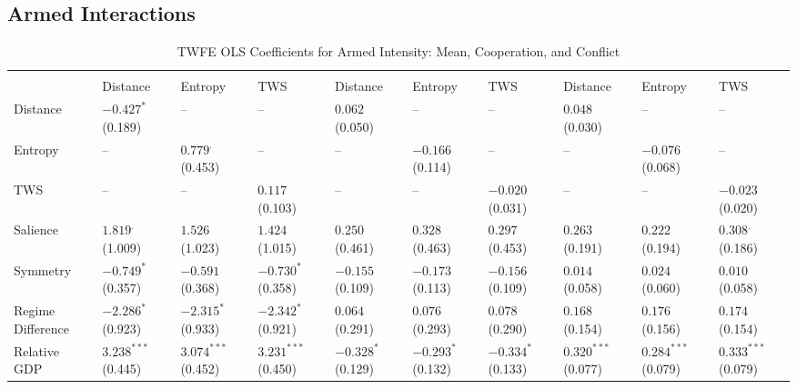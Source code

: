 \documentclass[12pt]{article}
\begin{document}
\subsection{Armed Interactions}
\begin{table}[htbp]\scriptsize
\centering
\caption{TWFE OLS Coefficients for Armed Intensity: Mean, Cooperation, and Conflict}
\renewcommand{\arraystretch}{1.2}
\begin{tabularx}{\textwidth}{
  l
  >{\centering\arraybackslash}X >{\centering\arraybackslash}X >{\centering\arraybackslash}X
  >{\centering\arraybackslash}X >{\centering\arraybackslash}X >{\centering\arraybackslash}X
  >{\centering\arraybackslash}X >{\centering\arraybackslash}X >{\centering\arraybackslash}X
}
\toprule
\rowcolor{gray!20}
 & \multicolumn{3}{c}{\textbf{Mean}} 
 & \multicolumn{3}{c}{\textbf{Cooperation}} 
 & \multicolumn{3}{c}{\textbf{Conflict}} \\
\cmidrule(lr){2-4} \cmidrule(lr){5-7} \cmidrule(lr){8-10}
 & Distance & Entropy & TWS & Distance & Entropy & TWS & Distance & Entropy & TWS \\
\midrule
Distance & $-0.427^{*}$ (0.189) & -- & -- & $0.062^{}$ (0.050) & -- & -- & $0.048^{}$ (0.030) & -- & -- \\
Entropy & -- & $0.779^{.}$ (0.453) & -- & -- & $-0.166^{}$ (0.114) & -- & -- & $-0.076^{}$ (0.068) & -- \\
TWS & -- & -- & $0.117^{}$ (0.103) & -- & -- & $-0.020^{}$ (0.031) & -- & -- & $-0.023^{}$ (0.020) \\
Salience & $1.819^{.}$ (1.009) & $1.526^{}$ (1.023) & $1.424^{}$ (1.015) & $0.250^{}$ (0.461) & $0.328^{}$ (0.463) & $0.297^{}$ (0.453) & $0.263^{}$ (0.191) & $0.222^{}$ (0.194) & $0.308^{.}$ (0.186) \\
Symmetry & $-0.749^{*}$ (0.357) & $-0.591^{}$ (0.368) & $-0.730^{*}$ (0.358) & $-0.155^{}$ (0.109) & $-0.173^{}$ (0.113) & $-0.156^{}$ (0.109) & $0.014^{}$ (0.058) & $0.024^{}$ (0.060) & $0.010^{}$ (0.058) \\
Regime Difference & $-2.286^{*}$ (0.923) & $-2.315^{*}$ (0.933) & $-2.342^{*}$ (0.921) & $0.064^{}$ (0.291) & $0.076^{}$ (0.293) & $0.078^{}$ (0.290) & $0.168^{}$ (0.154) & $0.176^{}$ (0.156) & $0.174^{}$ (0.154) \\
Relative GDP & $3.238^{***}$ (0.445) & $3.074^{***}$ (0.452) & $3.231^{***}$ (0.450) & $-0.328^{*}$ (0.129) & $-0.293^{*}$ (0.132) & $-0.334^{*}$ (0.133) & $0.320^{***}$ (0.077) & $0.284^{***}$ (0.079) & $0.333^{***}$ (0.079) \\

\end{tabularx}
\end{table}
\end{document}
